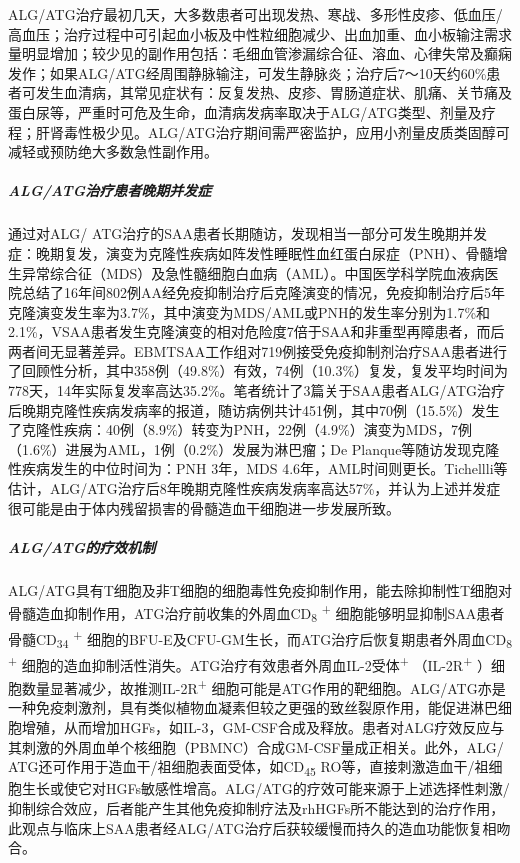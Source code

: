 ALG/ATG治疗最初几天，大多数患者可出现发热、寒战、多形性皮疹、低血压/高血压；治疗过程中可引起血小板及中性粒细胞减少、出血加重、血小板输注需求量明显增加；较少见的副作用包括：毛细血管渗漏综合征、溶血、心律失常及癫痫发作；如果ALG/ATG经周围静脉输注，可发生静脉炎；治疗后7～10天约60\%患者可发生血清病，其常见症状有：反复发热、皮疹、胃肠道症状、肌痛、关节痛及蛋白尿等，严重时可危及生命，血清病发病率取决于ALG/ATG类型、剂量及疗程；肝肾毒性极少见。ALG/ATG治疗期间需严密监护，应用小剂量皮质类固醇可减轻或预防绝大多数急性副作用。

\subparagraph{ALG/ATG治疗患者晚期并发症}

通过对ALG/
ATG治疗的SAA患者长期随访，发现相当一部分可发生晚期并发症：晚期复发，演变为克隆性疾病如阵发性睡眠性血红蛋白尿症（PNH）、骨髓增生异常综合征（MDS）及急性髓细胞白血病（AML）。中国医学科学院血液病医院总结了16年间802例AA经免疫抑制治疗后克隆演变的情况，免疫抑制治疗后5年克隆演变发生率为3.7\%，其中演变为MDS/AML或PNH的发生率分别为1.7\%和2.1\%，VSAA患者发生克隆演变的相对危险度7倍于SAA和非重型再障患者，而后两者间无显著差异。EBMTSAA工作组对719例接受免疫抑制剂治疗SAA患者进行了回顾性分析，其中358例（49.8\%）有效，74例（10.3\%）复发，复发平均时间为778天，14年实际复发率高达35.2\%。笔者统计了3篇关于SAA患者ALG/ATG治疗后晚期克隆性疾病发病率的报道，随访病例共计451例，其中70例（15.5\%）发生了克隆性疾病：40例（8.9\%）转变为PNH，22例（4.9\%）演变为MDS，7例（1.6\%）进展为AML，1例（0.2\%）发展为淋巴瘤；De
Planque等随访发现克隆性疾病发生的中位时间为：PNH 3年，MDS
4.6年，AML时间则更长。Tichellli等估计，ALG/ATG治疗后8年晚期克隆性疾病发病率高达57\%，并认为上述并发症很可能是由于体内残留损害的骨髓造血干细胞进一步发展所致。

\subparagraph{ALG/ATG的疗效机制}

ALG/ATG具有T细胞及非T细胞的细胞毒性免疫抑制作用，能去除抑制性T细胞对骨髓造血抑制作用，ATG治疗前收集的外周血CD\textsubscript{8}
\textsuperscript{+} 细胞能够明显抑制SAA患者骨髓CD\textsubscript{34}
\textsuperscript{+}
细胞的BFU-E及CFU-GM生长，而ATG治疗后恢复期患者外周血CD\textsubscript{8}
\textsuperscript{+}
细胞的造血抑制活性消失。ATG治疗有效患者外周血IL-2受体\textsuperscript{+}
（IL-2R\textsuperscript{+}
）细胞数量显著减少，故推测IL-2R\textsuperscript{+}
细胞可能是ATG作用的靶细胞。ALG/ATG亦是一种免疫刺激剂，具有类似植物血凝素但较之更强的致丝裂原作用，能促进淋巴细胞增殖，从而增加HGFs，如IL-3，GM-CSF合成及释放。患者对ALG疗效反应与其刺激的外周血单个核细胞（PBMNC）合成GM-CSF量成正相关。此外，ALG/
ATG还可作用于造血干/祖细胞表面受体，如CD\textsubscript{45}
RO等，直接刺激造血干/祖细胞生长或使它对HGFs敏感性增高。ALG/ATG的疗效可能来源于上述选择性刺激/抑制综合效应，后者能产生其他免疫抑制疗法及rhHGFs所不能达到的治疗作用，此观点与临床上SAA患者经ALG/ATG治疗后获较缓慢而持久的造血功能恢复相吻合。

